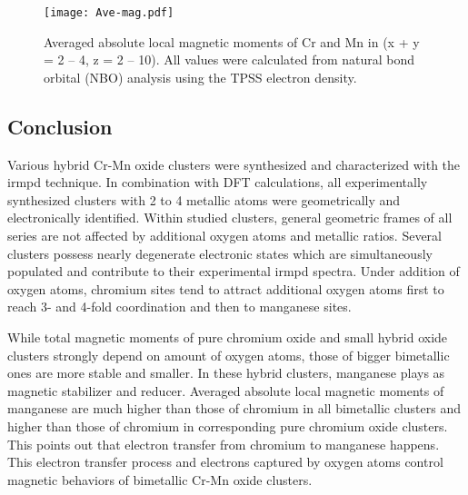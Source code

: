 \begin{refsection}
\begin{figure}[!htb]
	\centering
	\texttt{[image: Ave-mag.pdf]}
	\caption{Averaged absolute local magnetic moments of Cr and Mn in  (x + y = 2 -- 4, z = 2 -- 10). All values were calculated from natural bond orbital (NBO) analysis using the TPSS electron density.}
	\label{fig:Ave-mo}
\end{figure}





	
	


\subsection{Conclusion}


Various hybrid Cr-Mn oxide clusters were synthesized and characterized with the \acrshort{irmpd} technique. In combination with DFT calculations, all experimentally synthesized clusters with 2 to 4 metallic atoms were geometrically and electronically identified. Within studied clusters, general geometric frames of all series are not affected by additional oxygen atoms and metallic ratios. Several clusters possess nearly degenerate electronic states which are simultaneously populated and contribute to their experimental \acrshort{irmpd} spectra. Under addition of oxygen atoms, chromium sites tend to attract additional oxygen atoms first to reach 3- and 4-fold coordination and then to manganese sites. 


While total magnetic moments of pure chromium oxide  and small hybrid oxide  clusters strongly depend on amount of oxygen atoms, those of bigger bimetallic ones are more stable and smaller. In these hybrid clusters, manganese plays as magnetic stabilizer and reducer. Averaged absolute local magnetic moments of manganese are much higher than those of chromium in all bimetallic clusters and higher than those of chromium in corresponding pure chromium oxide clusters. This points out that electron transfer from chromium to manganese happens. This electron transfer process and electrons captured by oxygen atoms control magnetic behaviors of bimetallic Cr-Mn oxide clusters.   











\printbibliography[heading=subbibliography] %



\end{refsection}